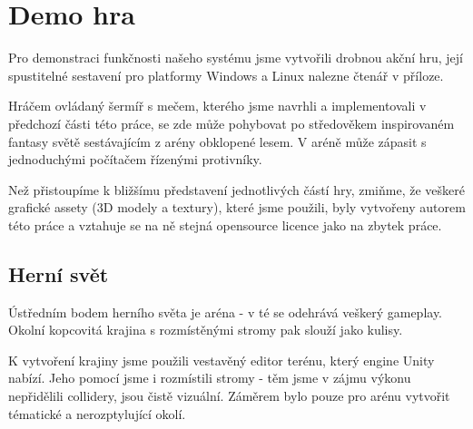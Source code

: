 


\section{Demo hra}

Pro demonstraci funkčnosti našeho systému jsme vytvořili drobnou akční hru, její spustitelné sestavení pro platformy Windows a Linux nalezne čtenář v příloze.

Hráčem ovládaný šermíř s mečem, kterého jsme navrhli a implementovali v předchozí části této práce, se zde může pohybovat po středověkem inspirovaném fantasy světě sestávajícím z arény obklopené lesem. V aréně může zápasit s jednoduchými počítačem řízenými protivníky.  

Než přistoupíme k bližšímu představení jednotlivých částí hry, zmiňme, že veškeré grafické assety (3D modely a textury), které jsme použili, byly vytvořeny autorem této práce a vztahuje se na ně stejná opensource licence jako na zbytek práce.


\subsection{Herní svět}

Ústředním bodem herního světa je aréna - v té se odehrává veškerý gameplay. Okolní kopcovitá krajina s rozmístěnými stromy pak slouží jako kulisy.

K vytvoření krajiny jsme použili vestavěný editor terénu, který engine Unity nabízí. Jeho pomocí jsme i rozmístili stromy - těm jsme v zájmu výkonu nepřidělili collidery, jsou čistě vizuální. Záměrem bylo pouze pro arénu vytvořit tématické a nerozptylující okolí.

